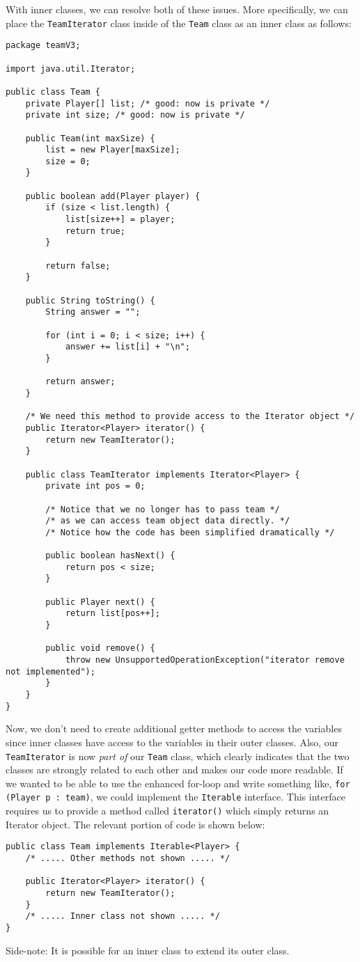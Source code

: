 With inner classes, we can resolve both of these issues. More specifically, we can place the \verb!TeamIterator! class inside of the \verb!Team! class as an inner class as follows:

\begin{lstlisting}
package teamV3;

import java.util.Iterator;

public class Team {
	private Player[] list; /* good: now is private */
	private int size; /* good: now is private */

	public Team(int maxSize) {
		list = new Player[maxSize];
		size = 0;
	}

	public boolean add(Player player) {
		if (size < list.length) {
			list[size++] = player;
			return true;
		}

		return false;
	}

	public String toString() {
		String answer = "";

		for (int i = 0; i < size; i++) {
			answer += list[i] + "\n";
		}

		return answer;
	}

	/* We need this method to provide access to the Iterator object */
	public Iterator<Player> iterator() {
		return new TeamIterator();
	}

	public class TeamIterator implements Iterator<Player> {
		private int pos = 0;

		/* Notice that we no longer has to pass team */
		/* as we can access team object data directly. */
		/* Notice how the code has been simplified dramatically */

		public boolean hasNext() {
			return pos < size;
		}

		public Player next() {
			return list[pos++];
		}

		public void remove() {
			throw new UnsupportedOperationException("iterator remove not implemented");
		}
	}
}
\end{lstlisting}

Now, we don't need to create additional getter methods to access the variables since inner classes have access to the variables in their outer classes. Also, our \verb!TeamIterator! is now \textit{part of} our \verb!Team! class, which clearly indicates that the two classes are strongly related to each other and makes our code more readable. If we wanted to be able to use the enhanced for-loop and write something like, \verb!for (Player p : team)!, we could implement the \verb!Iterable! interface. This interface requires us to provide a method called \verb!iterator()! which simply returns an Iterator object. The relevant portion of code is shown below:

\begin{lstlisting}
public class Team implements Iterable<Player> {
    /* ..... Other methods not shown ..... */
    
    public Iterator<Player> iterator() {
        return new TeamIterator();
    }
    /* ..... Inner class not shown ..... */
}
\end{lstlisting}

Side-note: It is possible for an inner class to extend its outer class. 